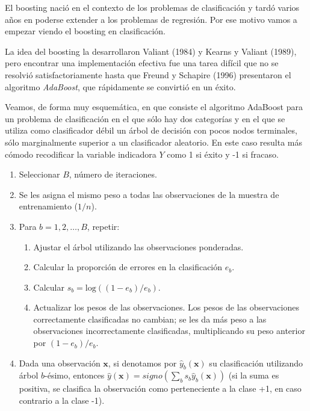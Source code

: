 \documentclass[]{book}
\theoremstyle{break}
\theoremstyle{definition}
\theoremstyle{definition}
\theoremstyle{definition}
\theoremstyle{remark}
\begin{document}
El boosting nació en el contexto de los problemas de clasificación y
tardó varios años en poderse extender a los problemas de regresión. Por
ese motivo vamos a empezar viendo el boosting en clasificación.

La idea del boosting la desarrollaron Valiant (1984) y Kearns y Valiant
(1989), pero encontrar una implementación efectiva fue una tarea difícil
que no se resolvió satisfactoriamente hasta que Freund y Schapire (1996)
presentaron el algoritmo \emph{AdaBoost}, que rápidamente se convirtió
en un éxito.

Veamos, de forma muy esquemática, en que consiste el algoritmo AdaBoost
para un problema de clasificación en el que sólo hay dos categorías y en
el que se utiliza como clasificador débil un árbol de decisión con pocos
nodos terminales, sólo marginalmente superior a un clasificador
aleatorio. En este caso resulta más cómodo recodificar la variable
indicadora \(Y\) como 1 si éxito y -1 si fracaso.

\begin{enumerate}
\def\labelenumi{\arabic{enumi}.}
\item
  Seleccionar \(B\), número de iteraciones.
\item
  Se les asigna el mismo peso a todas las observaciones de la muestra de
  entrenamiento (\(1/n\)).
\item
  Para \(b = 1, 2,\ldots, B\), repetir:

  \begin{enumerate}
  \def\labelenumii{\alph{enumii}.}
  \item
    Ajustar el árbol utilizando las observaciones ponderadas.
  \item
    Calcular la proporción de errores en la clasificación \(e_b\).
  \item
    Calcular \(s_b = \text{log}((1 - e_b)/e_b)\).
  \item
    Actualizar los pesos de las observaciones. Los pesos de las
    observaciones correctamente clasificadas no cambian; se les da más
    peso a las observaciones incorrectamente clasificadas, multiplicando
    su peso anterior por \((1 - e_b)/e_b\).
  \end{enumerate}
\item
  Dada una observación \(\mathbf{x}\), si denotamos por
  \(\hat y_b ( \mathbf{x} )\) su clasificación utilizando árbol
  \(b\)-ésimo, entonces
  \(\hat y( \mathbf{x} ) = signo \left( \sum_b s_b \hat y_b ( \mathbf{x} ) \right)\)
  (si la suma es positiva, se clasifica la observación como
  perteneciente a la clase +1, en caso contrario a la clase -1).
\end{enumerate}
\end{document}
